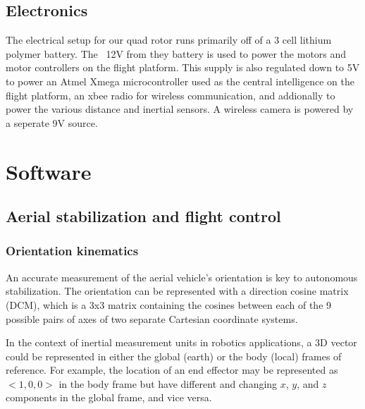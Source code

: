 \documentclass[12pt,letterpaper]{article}
\begin{document}
\subsection*{Electronics}

The electrical setup for our quad rotor runs primarily off of a 3 cell
lithium polymer battery. The ~12V from they battery is used to power the motors
and motor controllers on the flight platform. This supply is also regulated down
to 5V to power an Atmel Xmega microcontroller used as the central intelligence
on the flight platform, an xbee radio for wireless communication, and
addionally to power the various distance and inertial sensors. A wireless camera
is powered by a seperate 9V source.


\section*{Software}

\subsection*{Aerial stabilization and flight control}


\subsubsection*{Orientation kinematics}

An accurate measurement of the aerial vehicle's orientation is key to
autonomous stabilization. The orientation can be represented with a direction
cosine matrix (DCM), which is a 3x3 matrix containing the cosines between each
of the 9 possible pairs of axes of two separate Cartesian coordinate systems.

In the context of inertial measurement units in robotics applications, a 3D
vector could be represented in either the global (earth) or the body (local)
frames of reference. For example, the location of an end effector may be
represented as $<1, 0, 0>$ in the body frame but have different and changing
$x$, $y$, and $z$ components in the global frame, and vice versa.
\end{document}
